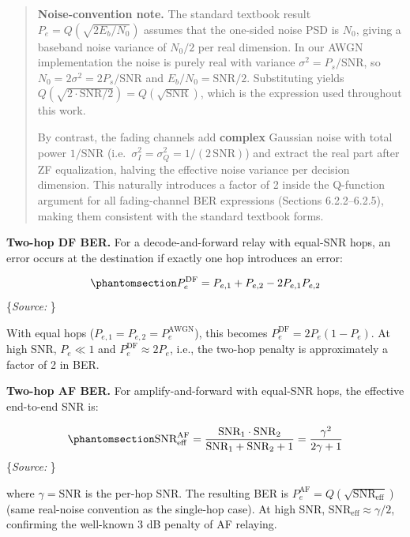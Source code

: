 \documentclass[
  english,
  12pt,
  12pt,
  a4paper,
  oneside]{report}
\begin{document}
\begin{quote}
\textbf{Noise-convention note.} The standard textbook result \(P_e = Q(\sqrt{2 E_b/N_0})\) assumes that the one-sided noise PSD is \(N_0\), giving a baseband noise variance of \(N_0/2\) per real dimension. In our AWGN implementation the noise is purely real with variance \(\sigma^2 = P_s/\text{SNR}\), so \(N_0 = 2\sigma^2 = 2P_s/\text{SNR}\) and \(E_b/N_0 = \text{SNR}/2\). Substituting yields \(Q(\sqrt{2 \cdot \text{SNR}/2}) = Q(\sqrt{\text{SNR}})\), which is the expression used throughout this work.

By contrast, the fading channels add \textbf{complex} Gaussian noise with total power \(1/\text{SNR}\) (i.e.~\(\sigma_I^2 = \sigma_Q^2 = 1/(2\,\text{SNR})\)) and extract the real part after ZF equalization, halving the effective noise variance per decision dimension. This naturally introduces a factor of 2 inside the Q-function argument for all fading-channel BER expressions (Sections 6.2.2--6.2.5), making them consistent with the standard textbook forms.
\end{quote}

\textbf{Two-hop DF BER.} For a decode-and-forward relay with equal-SNR hops, an error occurs at the destination if exactly one hop introduces an error:

\begin{equation}\protect\phantomsection\label{eq:df-ber-awgn}{P_e^{\text{DF}} = P_{e,1} + P_{e,2} - 2P_{e,1}P_{e,2}
}\end{equation} \footnotesize\{\textit{Source: \1}\}\normalsize

With equal hops (\(P_{e,1} = P_{e,2} = P_e^{\text{AWGN}}\)), this becomes \(P_e^{\text{DF}} = 2P_e(1 - P_e)\). At high SNR, \(P_e \ll 1\) and \(P_e^{\text{DF}} \approx 2P_e\), i.e., the two-hop penalty is approximately a factor of 2 in BER.

\textbf{Two-hop AF BER.} For amplify-and-forward with equal-SNR hops, the effective end-to-end SNR is:

\begin{equation}\protect\phantomsection\label{eq:af-snr-eff}{\text{SNR}_{\text{eff}}^{\text{AF}} = \frac{\text{SNR}_1 \cdot \text{SNR}_2}{\text{SNR}_1 + \text{SNR}_2 + 1} = \frac{\gamma^2}{2\gamma + 1}
}\end{equation} \footnotesize\{\textit{Source: \1}\}\normalsize

where \(\gamma = \text{SNR}\) is the per-hop SNR. The resulting BER is \(P_e^{\text{AF}} = Q\left(\sqrt{\text{SNR}_{\text{eff}}}\right)\) (same real-noise convention as the single-hop case). At high SNR, \(\text{SNR}_{\text{eff}} \approx \gamma/2\), confirming the well-known 3 dB penalty of AF relaying.
\end{document}
